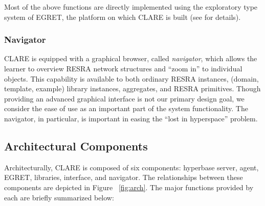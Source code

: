 Most of the above functions are directly implemented using the exploratory
type system of EGRET, the platform on which CLARE is built (see
\cite{csdl-92-01} for details).


\subsubsection{Navigator}

CLARE is equipped with a graphical browser, called {\it navigator\/}, which
allows the learner to overview RESRA network structures and ``zoom in'' to
individual objects. This capability is available to both ordinary RESRA
instances, (domain, template, example) library instances, aggregates, and
RESRA primitives. Though providing an advanced graphical interface is not
our primary design goal, we consider the ease of use as an important part
of the system functionality. The navigator, in particular, is important in
easing the ``lost in hyperspace'' problem.


\subsection{Architectural Components}

Architecturally, CLARE is composed of six components: hyperbase server,
agent, EGRET, libraries, interface, and navigator. The relationships
between these components are depicted in Figure ~\ref{fig:arch}. The major
functions provided by each are briefly summarized below:

